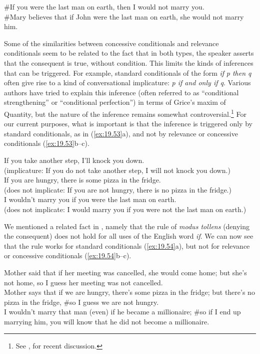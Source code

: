 \ea \label{ex:19.52}
\ea  \#If you were the last man on earth, then I would not marry you.\\
\ex \#Mary believes that if John were the last man on earth, she would not marry him.
\z
\z


Some of the similarities between concessive conditionals and relevance conditionals seem to be related to the fact that in both types, the speaker asserts that the consequent is true, without condition. This limits the kinds of inferences that can be triggered. For example, standard conditionals of the form \textit{if} \textit{p then q} often give rise to a kind of  conversational implicature: \textit{p if and only if q}. Various authors have tried to explain this inference (often referred to as “conditional strengthening” or “conditional perfection”) in terms of Grice’s maxim of Quantity, but the nature of the inference remains somewhat controversial.\footnote{See \citet{Horn2000}, \citet{vonFintel2001} for recent discussion.} For our current purposes, what is important is that the inference is triggered only by standard conditionals, as in (\ref{ex:19.53}a), and not by relevance or concessive conditionals (\ref{ex:19.53}b--c).


\ea \label{ex:19.53}
\ea  If you take another step, I’ll knock you down.\\
  (implicature: If you do not take another step, I will not knock you down.)\\
\ex If you are hungry, there is some pizza in the fridge.\\
  (does not implicate: If you are not hungry, there is no pizza in the fridge.)\\
\ex I wouldn’t marry you if you were the last man on earth.\\
  (does not implicate: I would marry you if you were not the last man on earth.)
\z
\z


We mentioned a related fact in , namely that the rule of \textit{modus tollens} (denying the consequent) does not hold for all uses of the English word \textit{if}. We can now see that the rule works for standard conditionals (\ref{ex:19.54}a), but not for relevance or concessive conditionals (\ref{ex:19.54}b--c).


\ea \label{ex:19.54}
\ea  Mother said that if her meeting was cancelled, she would come home; but she’s not home, so I guess her meeting was not cancelled.\\
\ex Mother says that if we are hungry, there’s some pizza in the fridge; but there’s no pizza in the fridge, \#so I guess we are not hungry.\\
\ex I wouldn’t marry that man (even) if he became a millionaire; \#so if I end up marrying him, you will know that he did not become a millionaire.
                       \z
\z


